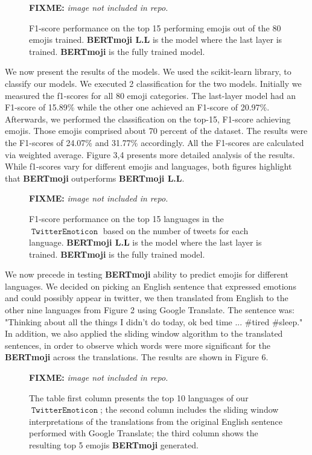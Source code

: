 \documentclass[11pt]{article}
\newcommand{\fixme}[1]{{\color{red} \textbf{FIXME:} {\textit {#1}}}}
\DeclareMathOperator{\emoticon}{\texttt{TwitterEmoticon}}
\begin{document}
\begin{figure}[ht]
    \centering
    \fixme{image not included in repo.}
    \caption{F1-score performance on the top 15 performing emojis out of the 80 emojis trained. 
    \textbf{BERTmoji L.L} is the model where the last layer is trained. \textbf{BERTmoji} is the fully trained model.}
    \label{fig:tweets_per_day}
\end{figure}

We now present the results of the models. We used the scikit-learn \cite{} library, to classify our models.
We executed 2 classification for the two models. Initially we measured the f1-scores for all 80 emoji categories.
The last-layer model had an F1-score of 15.89\% while the other one achieved an F1-score of 20.97\%. 
Afterwards, we performed the classification on the top-15, F1-score achieving emojis. 
Those emojis comprised about 70 percent of the dataset.
The results were the F1-scores of 24.07\% and 31.77\% accordingly.
All the F1-scores are calculated via weighted average. Figure 3,4 presents more detailed analysis of the results.
While f1-scores vary for different emojis and languages,
both figures highlight that  \textbf{BERTmoji} outperforms \textbf{BERTmoji L.L}. 

\begin{figure}[ht]
    \centering
    \fixme{image not included in repo.}
    \caption{F1-score performance on the top 15 languages in the $\emoticon$ based on the number of tweets for each language.
    \textbf{BERTmoji L.L} is the model where the last layer is trained. \textbf{BERTmoji} is the fully trained model.}
    \label{fig:tweets_per_day}
\end{figure}
We now precede in testing \textbf{BERTmoji} ability to predict emojis for different languages.
We decided on picking an English sentence that expressed emotions and could possibly appear in twitter,
we then translated from English to the other nine languages from Figure 2 using Google Translate.
The sentence was: "Thinking about all the things I didn't do today, ok bed time ... \#tired \#sleep."
In addition, we also applied the sliding window algorithm to the translated sentences,
in order to observe which words were more significant for the \textbf{BERTmoji} across the translations.
The results are shown in Figure 6. 

\begin{figure}[ht]
    \centering
    \fixme{image not included in repo.}
    \caption{The table first column presents the top 10 languages of our $\emoticon$; 
    the second column includes the sliding window interpretations of the translations from the original English sentence performed with Google Translate;
    the third column shows the resulting top 5 emojis \textbf{BERTmoji} generated.
     }
    \label{fig:prediction_top10_langs}
\end{figure}
\end{document}
